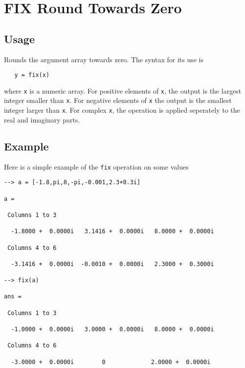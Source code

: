 \section{FIX Round Towards Zero}

\subsection{Usage}

Rounds the argument array towards zero.  The syntax for its use is
\begin{verbatim}
   y = fix(x)
\end{verbatim}
where \verb|x| is a numeric array.  For positive elements of \verb|x|, the output
is the largest integer smaller than \verb|x|.  For negative elements of \verb|x|
the output is the smallest integer larger than \verb|x|.  For complex \verb|x|,
the operation is applied seperately to the real and imaginary parts.
\subsection{Example}

Here is a simple example of the \verb|fix| operation on some values
\begin{verbatim}
--> a = [-1.8,pi,8,-pi,-0.001,2.3+0.3i]

a = 

 Columns 1 to 3

  -1.8000 +  0.0000i   3.1416 +  0.0000i   8.0000 +  0.0000i 

 Columns 4 to 6

  -3.1416 +  0.0000i  -0.0010 +  0.0000i   2.3000 +  0.3000i 

--> fix(a)

ans = 

 Columns 1 to 3

  -1.0000 +  0.0000i   3.0000 +  0.0000i   8.0000 +  0.0000i 

 Columns 4 to 6

  -3.0000 +  0.0000i        0             2.0000 +  0.0000i 
\end{verbatim}
